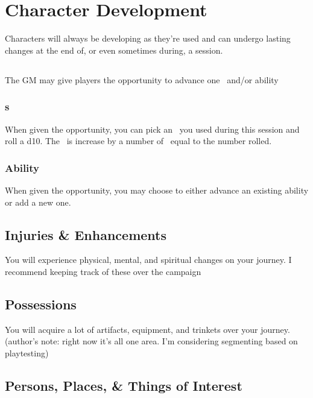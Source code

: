 

\chapter{Character Development}
Characters will always be developing as they're used and can undergo lasting changes at the end of, or even sometimes during, a session.

\section{\advancement\index{\advancement}}
The GM may give players the opportunity to advance one \attribute\ and/or ability

\subsection{\attribute s}
When given the opportunity, you can pick an \attribute\ you used during this session and roll a d10. The \attribute\ is increase by a number of \attrval\ equal to the number rolled.

\subsection{Ability \advancement}
When given the opportunity, you may choose to either advance an existing ability or add a new one.
\section{Injuries \& Enhancements}
You will experience physical, mental, and spiritual changes on your journey. I recommend keeping track of these over the campaign

\section{Possessions}
You will acquire a lot of artifacts, equipment, and trinkets over your journey. (author's note: right now it's all one area. I'm considering segmenting based on playtesting)

\section{Persons, Places, \& Things of Interest}
